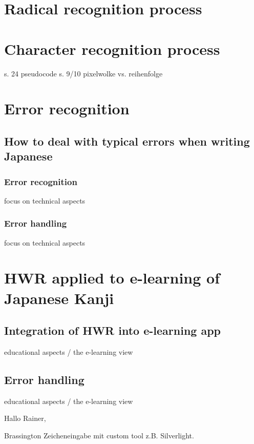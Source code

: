 \section{Radical recognition process}
\section{Character recognition process}

s. 24 pseudocode
s. 9/10 pixelwolke vs. reihenfolge

\section{Error recognition}
\subsection{How to deal with typical errors when writing Japanese}
\subsubsection{Error recognition}
focus on technical aspects
\subsubsection{Error handling}
focus on technical aspects

\section{HWR applied to e-learning of Japanese Kanji}
\subsection{Integration of HWR into e-learning app}
educational aspects / the e-learning view
\subsection{Error handling}
educational aspects / the e-learning view



Hallo Rainer,

Brassington
Zeicheneingabe mit custom tool z.B. Silverlight.
